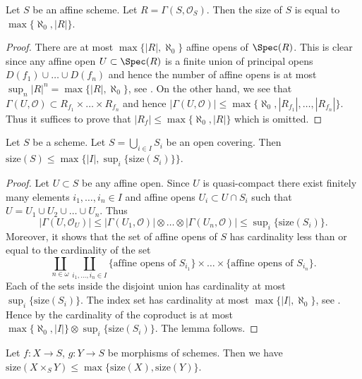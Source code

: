 \begin{lemma}
\label{lemma-bound-affine}
Let $S$ be an affine scheme.
Let $R = \Gamma(S, \mathcal{O}_S)$.
Then the size of $S$ is equal to $\max\{ \aleph_0, |R|\}$.
\end{lemma}

\begin{proof}
There are at most $\max\{|R|, \aleph_0\}$ affine opens of
$\Spec(R)$. This is clear since any affine open
$U \subset \Spec(R)$ is a finite union of principal
opens $D(f_1) \cup \ldots \cup D(f_n)$ and hence the number
of affine opens is at most $\sup_n |R|^n = \max\{|R|, \aleph_0\}$,
see \cite[Ch. I, 10.13]{Kunen}. On the other hand, we see that
$\Gamma(U, \mathcal{O}) \subset R_{f_1} \times \ldots \times R_{f_n}$
and hence $|\Gamma(U, \mathcal{O})| \leq
\max\{\aleph_0, |R_{f_1}|, \ldots, |R_{f_n}|\}$. Thus
it suffices to prove that $|R_f| \leq \max\{\aleph_0, |R|\}$
which is omitted.
\end{proof}

\begin{lemma}
\label{lemma-bound-size}
Let $S$ be a scheme. Let $S = \bigcup_{i \in I} S_i$ be
an open covering. Then
$\text{size}(S) \leq \max\{|I|, \sup_i\{\text{size}(S_i)\}\}$.
\end{lemma}

\begin{proof}
Let $U \subset S$ be any affine open. Since $U$ is quasi-compact
there exist finitely many elements $i_1, \ldots, i_n \in I$
and affine opens $U_i \subset U \cap S_i$ such that
$U = U_1 \cup U_2 \cup \ldots \cup U_n$. Thus
$$
|\Gamma(U, \mathcal{O}_U)|
\leq
|\Gamma(U_1, \mathcal{O})|
\otimes
\ldots
\otimes
|\Gamma(U_n, \mathcal{O})|
\leq \sup\nolimits_i\{\text{size}(S_i)\}.
$$
Moreover, it shows that the set of affine opens of $S$ has
cardinality less than or equal to the cardinality of the set
$$
\coprod_{n \in \omega}
\coprod_{i_1, \ldots, i_n \in I}
\{\text{affine opens of }S_{i_1}\}
\times
\ldots
\times
\{\text{affine opens of }S_{i_n}\}.
$$
Each of the sets inside the disjoint union has cardinality at most
$\sup_i\{\text{size}(S_i)\}$. The index set has cardinality at most
$\max\{|I|, \aleph_0\}$, see \cite[Ch. I, 10.13]{Kunen}.
Hence by \cite[Lemma 5.8]{Jech} the cardinality
of the coproduct is at most $\max\{\aleph_0, |I|\}
\otimes \sup_i\{\text{size}(S_i)\}$. The lemma follows.
\end{proof}

\begin{lemma}
\label{lemma-bound-size-fibre-product}
Let $f : X \to S$, $g : Y \to S$ be morphisms of schemes.
Then we have
$\text{size}(X \times_S Y) \leq \max\{\text{size}(X), \text{size}(Y)\}$.
\end{lemma}

